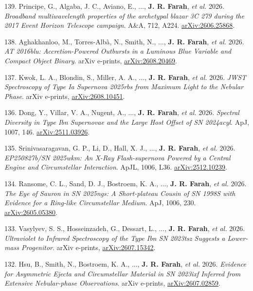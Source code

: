 \documentclass[margin,line]{res}
\newcommand{\apj}{ApJ}                    %
\newcommand{\apjl}{ApJL}                  %
\newcommand{\aap}{A\&A}                   %
\begin{document}
\begin{resume}
139. Principe, G., Algaba, J. C., Aviano, E., ..., \textbf{J. R. Farah}, \textit{et al.} 2026. \textit{Broadband multiwavelength properties of the archetypal blazar 3C 279 during the 2017 Event Horizon Telescope campaign}. \aap, 712, A224. \href{https://arxiv.org/abs/2606.25868}{arXiv:2606.25868}.

138. Aghakhanloo, M., Torres-Alb{\`a}, N., Smith, N., ..., \textbf{J. R. Farah}, \textit{et al.} 2026. \textit{AT 2016blu: Accretion-Powered Outbursts in a Luminous Blue Variable and Compact Object Binary}. arXiv e-prints, \href{https://arxiv.org/abs/2608.20469}{arXiv:2608.20469}.

137. Kwok, L. A., Blondin, S., Miller, A. A., ..., \textbf{J. R. Farah}, \textit{et al.} 2026. \textit{JWST Spectroscopy of Type Ia Supernova 2025rbs from Maximum Light to the Nebular Phase}. arXiv e-prints, \href{https://arxiv.org/abs/2608.10451}{arXiv:2608.10451}.

136. Dong, Y., Villar, V. A., Nugent, A., ..., \textbf{J. R. Farah}, \textit{et al.} 2026. \textit{Spectral Diversity in Type Ibn Supernovae and the Large Host Offset of SN 2024acyl}. \apj, 1007, 146. \href{https://arxiv.org/abs/2511.03926}{arXiv:2511.03926}.

135. Srinivasaragavan, G. P., Li, D., Hall, X. J., ..., \textbf{J. R. Farah}, \textit{et al.} 2026. \textit{EP250827b/SN 2025wkm: An X-Ray Flash-supernova Powered by a Central Engine and Circumstellar Interaction}. \apjl, 1006, L36. \href{https://arxiv.org/abs/2512.10239}{arXiv:2512.10239}.

134. Ransome, C. L., Sand, D. J., Bostroem, K. A., ..., \textbf{J. R. Farah}, \textit{et al.} 2026. \textit{The Eye of Sauron in SN 2025ngs: A Short-plateau Cousin of SN 1998S with Evidence for a Ring-like Circumstellar Medium}. \apj, 1006, 230. \href{https://arxiv.org/abs/2605.05380}{arXiv:2605.05380}.

133. Vasylyev, S. S., Hosseinzadeh, G., Dessart, L., ..., \textbf{J. R. Farah}, \textit{et al.} 2026. \textit{Ultraviolet to Infrared Spectroscopy of the Type Ibn SN 2023tsz Suggests a Lower-mass Progenitor}. arXiv e-prints, \href{https://arxiv.org/abs/2607.15342}{arXiv:2607.15342}.

132. Hsu, B., Smith, N., Bostroem, K. A., ..., \textbf{J. R. Farah}, \textit{et al.} 2026. \textit{Evidence for Asymmetric Ejecta and Circumstellar Material in SN 2023ixf Inferred from Extensive Nebular-phase Observations}. arXiv e-prints, \href{https://arxiv.org/abs/2607.02859}{arXiv:2607.02859}.


\end{resume}
\end{document}
